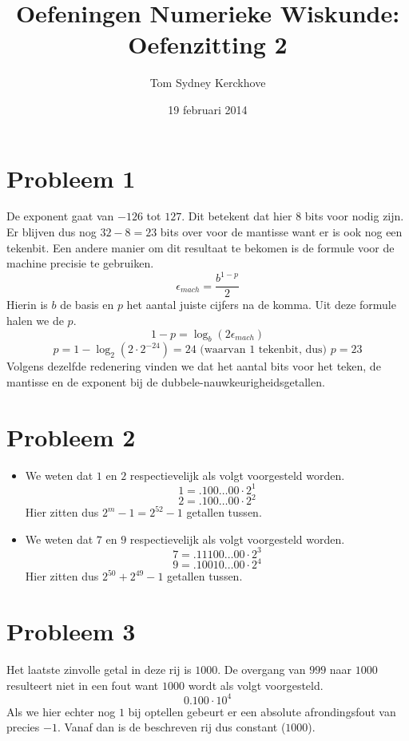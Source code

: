 \documentclass[12pt,a4paper]{article}
\author{Tom Sydney Kerckhove}
\title{Oefeningen Numerieke Wiskunde:\\ Oefenzitting 2}
\date{19 februari 2014}
\begin{document}
\maketitle

\section{Probleem 1}
De exponent gaat van $-126$ tot $127$. Dit betekent dat hier $8$ bits voor nodig zijn. Er blijven dus nog $32-8 = 23$ bits over voor de mantisse want er is ook nog een tekenbit.
Een andere manier om dit resultaat te bekomen is de formule voor de machine precisie te gebruiken.
\[
\epsilon_{mach} = \frac{b^{1-p}}{2}
\]
Hierin is $b$ de basis en $p$ het aantal juiste cijfers na de komma.
Uit deze formule halen we de $p$.
\[
1-p=\log_{b}(2\epsilon_{mach})
\]
\[
p = 1-\log_{2}(2\cdot 2^{-24}) = 24 \text{ (waarvan 1 tekenbit, dus) } p = 23
\]
Volgens dezelfde redenering vinden we dat het aantal bits voor het teken, de mantisse en de exponent bij de dubbele-nauwkeurigheidsgetallen.

\section{Probleem 2}
\begin{itemize}
\item We weten dat $1$ en $2$ respectievelijk als volgt voorgesteld worden.
\[1 = .100\ldots00 \cdot 2^1\]
\[2 = .100\ldots00 \cdot 2^2\]
Hier zitten dus $2^m-1=2^{52}-1$ getallen tussen.
\item We weten dat $7$ en $9$ respectievelijk als volgt voorgesteld worden.
\[7 = .11100\ldots00 \cdot 2^3\]
\[9 = .10010\ldots00 \cdot 2^4\]
Hier zitten dus $2^{50}+2^{49}-1$ getallen tussen.
\end{itemize}

\section{Probleem 3}
Het laatste zinvolle getal in deze rij is $1000$. De overgang van $999$ naar $1000$ resulteert niet in een fout want $1000$ wordt als volgt voorgesteld.
\[0.100 \cdot 10^4\]
Als we hier echter nog $1$ bij optellen gebeurt er een absolute afrondingsfout van precies $-1$. Vanaf dan is de beschreven rij dus constant ($1000$).
\end{document}
